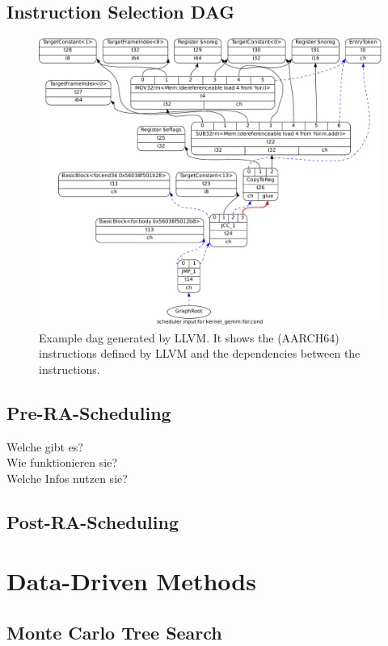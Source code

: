 \subsection{Instruction Selection DAG}
\begin{figure}
    \centering
    \includegraphics[width=\textwidth]{img/example-dag-crop.pdf}
    \caption[Example  generated by LLVM]{Example \ac{dag} generated by LLVM. It shows the (AARCH64) instructions defined by LLVM and the dependencies between the instructions.}
    \label{fig:bg:dag}
\end{figure}
\subsection{Pre-RA-Scheduling}
Welche gibt es?\\
Wie funktionieren sie?\\
Welche Infos nutzen sie?\\
\subsection{Post-RA-Scheduling}

\section{Data-Driven Methods}
\subsection{Monte Carlo Tree Search}
\label{sec:bg:mcts}
